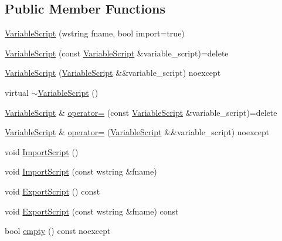 \subsection*{Public Member Functions}
\begin{DoxyCompactItemize}
\item 
\mbox{\hyperlink{classmage_1_1_variable_script_a87830f09a97aa8f7df3074029c5ab8d5}{Variable\+Script}} (wstring fname, bool import=true)
\item 
\mbox{\hyperlink{classmage_1_1_variable_script_aebd4e6cf2bdae4e57c9da428007fc4d7}{Variable\+Script}} (const \mbox{\hyperlink{classmage_1_1_variable_script}{Variable\+Script}} \&variable\+\_\+script)=delete
\item 
\mbox{\hyperlink{classmage_1_1_variable_script_ac29cca638a32bccae00a9e53404158d5}{Variable\+Script}} (\mbox{\hyperlink{classmage_1_1_variable_script}{Variable\+Script}} \&\&variable\+\_\+script) noexcept
\item 
virtual \mbox{\hyperlink{classmage_1_1_variable_script_ae7026e1283b1a1164f02fdc3e1f2b829}{$\sim$\+Variable\+Script}} ()
\item 
\mbox{\hyperlink{classmage_1_1_variable_script}{Variable\+Script}} \& \mbox{\hyperlink{classmage_1_1_variable_script_ae090b066ea939fc6611e77a47df6a97f}{operator=}} (const \mbox{\hyperlink{classmage_1_1_variable_script}{Variable\+Script}} \&variable\+\_\+script)=delete
\item 
\mbox{\hyperlink{classmage_1_1_variable_script}{Variable\+Script}} \& \mbox{\hyperlink{classmage_1_1_variable_script_a7cb6a585a701268aaac38d8f039fc403}{operator=}} (\mbox{\hyperlink{classmage_1_1_variable_script}{Variable\+Script}} \&\&variable\+\_\+script) noexcept
\item 
void \mbox{\hyperlink{classmage_1_1_variable_script_a5f1cc3bfb611edbc8dfb433ec55cc965}{Import\+Script}} ()
\item 
void \mbox{\hyperlink{classmage_1_1_variable_script_ae8bbfb30b5d47b5c66cd1b45bdd2cec5}{Import\+Script}} (const wstring \&fname)
\item 
void \mbox{\hyperlink{classmage_1_1_variable_script_ab12b7f789f6af2b301ff350fa401b324}{Export\+Script}} () const
\item 
void \mbox{\hyperlink{classmage_1_1_variable_script_a05ce2bcc72418422a443bcd8eff23486}{Export\+Script}} (const wstring \&fname) const
\item 
bool \mbox{\hyperlink{classmage_1_1_variable_script_a8a3f47783455cd6264dfc996887fd0f0}{empty}} () const noexcept
\item 

\end{DoxyCompactItemize}
